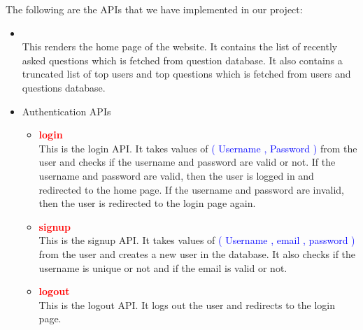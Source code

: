 \documentclass{article}
\begin{document}
The following are the APIs that we have implemented in our project:

\begin{itemize}
    \item \textcolor{red}{\textbf{\textfractionsolidus}} \\ This renders the home page of the website.
    It contains the list of recently asked questions which is fetched from question database. It also contains a truncated list of top users and top questions which is fetched from users and questions database.
    \item Authentication APIs
    \begin{itemize}
        \item \textcolor{red}{\textbf{ \textfractionsolidus login}}  \\ This is the login API. It takes values of \textcolor{blue}{( Username , Password )} from the user and checks if the username and password are valid or not. If the username and password are valid, then the user is logged in and redirected to the home page. If the username and password are invalid, then the user is redirected to the login page again.
        \item \textcolor{red}{\textbf{ \textfractionsolidus signup}} \\ This is the signup API. It takes values of \textcolor{blue}{( Username , email , password )} from the user and creates a new user in the database. It also checks if the username is unique or not and if the email is valid or not.
        \item \textcolor{red}{\textbf{ \textfractionsolidus logout}} \\ This is the logout API. It logs out the user and redirects to the login page.
    \end{itemize}
    

\end{itemize}
\end{document}
